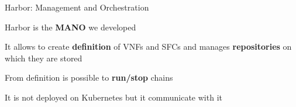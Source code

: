 \begin{frame}{Harbor: Management and Orchestration}

  Harbor is the \textbf{MANO} we developed

  \vfill{}

  It allows to create \textbf{definition} of VNFs and SFCs and manages
  \textbf{repositories} on which they are stored

  \vfill{}

  From definition is possible to \textbf{run/stop} chains

  \vfill{}

  It is not deployed on Kubernetes but it communicate with it

  \vfill{}

\end{frame}